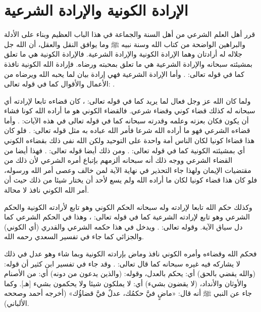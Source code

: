 \section{الإرادة الكونية والإرادة الشرعية}

قرر أهل العلم الشرعي من أهل السنة والجماعة في هذا الباب العظيم وبناء على الأدلة والبراهين الواضحة من كتاب الله وسنة نبيه ﷺ وما يوافق النقل والعقل، أن الله جل جلاله له أرادتان وهما الإرادة الكونية والإرادة الشرعية. فالإرادة الكونية هي ما تعلق بمشيئته سبحانه والإرادة الشرعية هي ما تعلق بمحبته ورضاه. فإرادة الله الكونية نافذة كما في قوله تعالى:
\quranayah*[36][82]{\footnotesize \surahname*[36]}. وأما الإرادة الشرعية فهي إرادة بيان لما يحبه الله ويرضاه من الأعمال والأقوال كما في قوله تعالى:
\quranayah*[4][26-28]{\footnotesize \surahname*[4]}.

ولما كان الله عز وجل فعال لما يريد كما في قوله تعالى:
\quranayah*[85][16]{\footnotesize \surahname*[16]}، كان قضاءه تابعا لإرادته أي سبحانه له كذلك قضاء كوني وقضاء شرعي. فالقضاء الكوني هو ما أراده الله كونا فشاء أن يكون فكان بعزته وعلمه وقدرته سبحانه كما في قوله تعالى في هذه الآيات:
\quranayah*[2][117]{\footnotesize \surahname*[2]}. %
وأما قضاءه الشرعي فهو ما أراده الله شرعا فأمر الله عباده به مثل قوله تعالى:
\quranayah*[17][23]{\footnotesize \surahname*[17]}. فلو كان هذا قضاءا كونيا لكان الناس أمة واحدة على التوحيد ولكن الله نفى ذلك بقضاءه الكوني أي بمشيئته الكونية كما في قوله تعالى: \quranayah*[16][93]{\footnotesize \surahname*[16]}.
ومن ذلك أيضا قوله تعالى:
\quranayah*[33][36]{\footnotesize \surahname*[33]}. فهذا أيضا من القضاء الشرعي ووجه ذلك أنه سبحانه ألزمهم بإتباع أمره الشرعي لأن ذلك من مقتضيات الإيمان ولهذا جاء التحذير في نهاية الآية لمن خالف وعصى أمر الله ورسوله، فلو كان هذا قضاء كونيا لكان ما أراده الله ولم يسع لأحد أن يختار شيئا من ذلك حيث أن أمر الله الكوني نافذ لا محالة.

وكذلك حكم الله تابعا لإرادته وله سبحانه الحكم الكوني وهو تابع لأرادته الكونية والحكم الشرعي وهو تابع لإرادته الشرعية كما في قوله تعالى:
\quranayah*[5][1]{\footnotesize \surahname*[5]}، وهذا في الحكم الشرعي كما دل سياق الآية. وقوله تعالى:
\quranayah*[13][41]{\footnotesize \surahname*[13]}. ويدخل في هذا حكمه الشرعي والقدري (أي الكوني) والجزائي كما جاء في تفسير السعدي رحمه الله.

فحكم الله وقضاءه وأمره الكوني نافذ وماض بإرادته الكونية وبما شاء وهو عدل في ذلك لا يشاركه فيه غيره سبحانه كما قال تعالى:
\quranayah*[40][20]{\footnotesize \surahname*[40]}. وقد جاء في تفسير ابن كثير أن قوله: (والله يقضي بالحق) أي: يحكم بالعدل، وقوله: (والذين يدعون من دونه) أي: من الأصنام والأوثان والأنداد، (لا يقضون بشيء) أي: لا يملكون شيئا ولا يحكمون بشيء [هـ]. وكما جاء عن النبي ﷺ أنه قال:
«ماضٍ فيَّ حكمُك، عدلٌ فيَّ قضاؤُك» {\footnotesize (أخرجه أحمد وصححه الألباني)}. 

